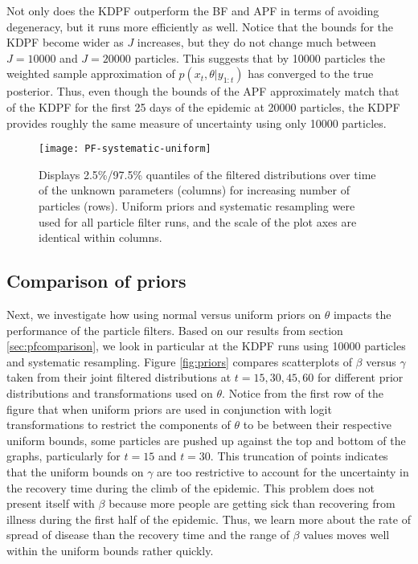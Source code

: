 \documentclass{elsarticle}
\begin{document}
Not only does the KDPF outperform the BF and APF in terms of avoiding degeneracy, but it runs more efficiently as well.  Notice that the bounds for the KDPF become wider as $J$ increases, but they do not change much between $J = 10000$ and $J = 20000$ particles.  This suggests that by 10000 particles the weighted sample approximation of $p(x_t,\theta|y_{1:t})$ has converged to the true posterior.  Thus, even though the bounds of the APF approximately match that of the KDPF for the first 25 days of the epidemic at 20000 particles, the KDPF provides roughly the same measure of uncertainty using only 10000 particles.

\begin{figure}
\centering
\texttt{[image: PF-systematic-uniform]}
\caption{Displays 2.5\%/97.5\% quantiles of the filtered distributions over time of the unknown parameters (columns) for increasing number of particles (rows).  Uniform priors and systematic resampling were used for all particle filter runs, and the scale of the plot axes are identical within columns.} \label{fig:pfs}
\end{figure}

\subsection{Comparison of priors}

Next, we investigate how using normal versus uniform priors on $\theta$ impacts the performance of the particle filters.  Based on our results from section \ref{sec:pfcomparison}, we look in particular at the KDPF runs using 10000 particles and systematic resampling.  Figure \ref{fig:priors} compares scatterplots of $\beta$ versus $\gamma$ taken from their joint filtered distributions at $t = 15, 30, 45, 60$ for different prior distributions and transformations used on $\theta$.  Notice from the first row of the figure that when uniform priors are used in conjunction with logit transformations to restrict the components of $\theta$ to be between their respective uniform bounds, some particles are pushed up against the top and bottom of the graphs, particularly for $t = 15$ and $t = 30$.   This truncation of points indicates that the uniform bounds on $\gamma$ are too restrictive to account for the uncertainty in the recovery time during the climb of the epidemic.  This problem does not present itself with $\beta$ because more people are getting sick than recovering from illness during the first half of the epidemic.  Thus, we learn more about the rate of spread of disease than the recovery time and the range of $\beta$ values moves well within the uniform bounds rather quickly.
\end{document}
